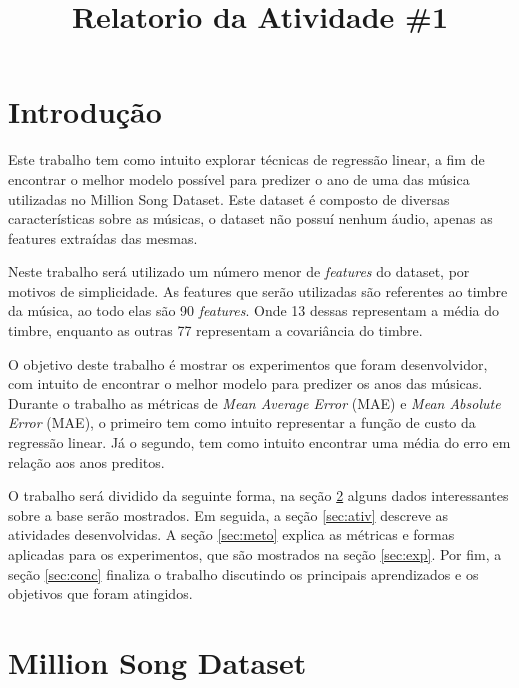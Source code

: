 \documentclass[conference]{IEEEtran}
\begin{document}
\title{Relatorio da Atividade \#1}

\author{
\and
{}
}

\maketitle

\section{Introdução}

Este trabalho tem como intuito explorar técnicas de regressão linear, a fim de encontrar o melhor modelo possível para predizer o ano de uma das música utilizadas no  Million Song Dataset. Este dataset é composto de diversas características sobre as músicas, o dataset não possuí nenhum áudio, apenas as features extraídas das mesmas.

Neste trabalho será utilizado um número menor de \emph{features} do dataset, por motivos de simplicidade. As features que serão utilizadas são referentes ao timbre da música, ao todo elas são 90 \emph{features}. Onde 13 dessas representam a média do timbre, enquanto as outras 77 representam a covariância do timbre.

O objetivo deste trabalho é mostrar os experimentos que foram desenvolvidor, com intuito de encontrar o melhor modelo para predizer os anos das músicas. Durante o trabalho as métricas de \emph{Mean Average Error} (MAE) e  \emph{Mean Absolute Error} (MAE), o primeiro tem como intuito representar a função de custo da regressão linear. Já o segundo, tem como intuito encontrar uma média do erro em relação aos anos preditos.

O trabalho será dividido da seguinte forma, na seção \ref{sec:base} alguns dados interessantes sobre a base serão mostrados. Em seguida, a seção \ref{sec:ativ} descreve as atividades desenvolvidas. A seção \ref{sec:meto} explica as métricas e formas aplicadas para os experimentos, que são mostrados na seção \ref{sec:exp}. Por fim, a seção \ref{sec:conc} finaliza o trabalho discutindo os principais aprendizados e os objetivos que foram atingidos.

\section{Million Song Dataset} \label{sec:base}
\end{document}
